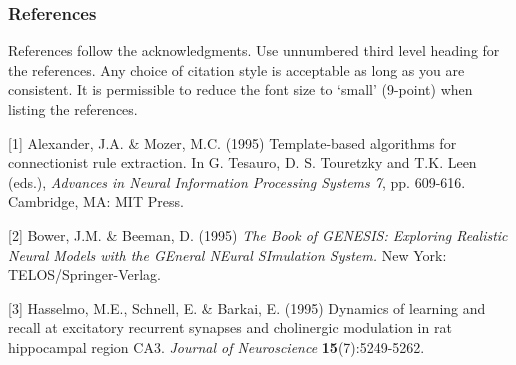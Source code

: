 \documentclass{article}
\newcommand{\GNP}[1][\psi]{{#1}_{\Theta}}
\DeclareMathOperator{\op}{op}
\begin{document}

\subsubsection*{References}

References follow the acknowledgments. Use unnumbered third level heading for
the references. Any choice of citation style is acceptable as long as you are
consistent. It is permissible to reduce the font size to `small' (9-point) 
when listing the references.

\small{
[1] Alexander, J.A. \& Mozer, M.C. (1995) Template-based algorithms
for connectionist rule extraction. In G. Tesauro, D. S. Touretzky
and T.K. Leen (eds.), {\it Advances in Neural Information Processing
Systems 7}, pp. 609-616. Cambridge, MA: MIT Press.

[2] Bower, J.M. \& Beeman, D. (1995) {\it The Book of GENESIS: Exploring
Realistic Neural Models with the GEneral NEural SImulation System.}
New York: TELOS/Springer-Verlag.

[3] Hasselmo, M.E., Schnell, E. \& Barkai, E. (1995) Dynamics of learning
and recall at excitatory recurrent synapses and cholinergic modulation
in rat hippocampal region CA3. {\it Journal of Neuroscience}
{\bf 15}(7):5249-5262.
}
\end{document}
